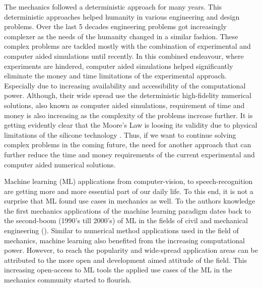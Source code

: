 The mechanics followed a deterministic approach for many years. This deterministic approaches helped humanity in various engineering and design problems. Over the last 5 decades engineering problems got increasingly complexer as the needs of the humanity changed in a similar fashion. These complex problems are tackled mostly with the combination of experimental and computer aided simulations until recently. In this combined endeavour, where experiments are hindered, computer aided simulations helped significantly eliminate the money and time limitations of the experimental approach. Especially due to increasing availability and accessibility of the computational power. Although, their wide spread use the deterministic high-fidelity numerical solutions, also known as computer aided simulations, requirement of time and money is also increasing as the complexity of the problems increase further. It is getting evidently clear that the Moore's Law is loosing its validity due to physical limitations of the silicone technology \cite{arenas2021}. Thus, if we want to continue solving complex problems in the coming future, the need for another approach that can further reduce the time and money requirements of the current experimental and computer aided numerical solutions.

Machine learning (ML) applications from computer-vision, to speech-recognition are getting more and more essential part of our daily life. To this end, it is not a surprise that ML found use cases in mechanics as well. To the authors knowledge the first mechanics applications of the machine learning paradigm dates back to the second-boom (1990's till 2000's) of ML in the fields of civil and mechanical engineering (\eg \cite{reich1997,reich1995,bishop1993,adeli}). Similar to numerical method applications used in the field of mechanics, machine learning also benefited from the increasing computational power. However, to reach the popularity and wide-spread application areas can be attributed to the more open and development aimed attitude of the field. This increasing open-access to ML tools the applied use cases of the ML in the mechanics community started to flourish.


